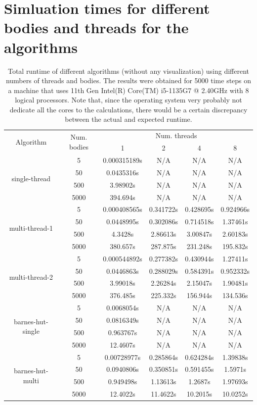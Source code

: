 \documentclass[12pt]{article}
\begin{document}
\appendix
\section{Simluation times for different bodies and threads for the algorithms}
\label{appendix:table}
\begin{table}[htb]
\centering
\begin{tabular}{ |c|c|c|c|c|c| } 
 \hline
 \multirow{2}{8em}{\centering Algorithm}
 & \multirow{2}{4em}{\centering Num. bodies} & \multicolumn{4}{c|}{\centering Num. threads} \\
 \cline{3-6}  
 & & 1 & 2 & 4 & 8\\ 
 \hline
 \multirow{4}{8em}{\centering single-thread} 
 & 5 & 0.000315189s & N/A & N/A & N/A \\ 
 & 50 & 0.0435316s & N/A & N/A & N/A \\ 
 & 500 & 3.98902s & N/A & N/A & N/A \\ 
 & 5000 & 394.694s & N/A & N/A & N/A \\ 
 \hline
 \multirow{4}{8em}{\centering multi-thread-1} 
 & 5 & 0.000408565s & 0.341722s & 0.428695s & 0.924966s \\ 
 & 50 & 0.0448995s & 0.302086s & 0.714518s & 1.37461s \\ 
 & 500 & 4.3428s & 2.86613s & 3.00847s & 2.60183s \\ 
 & 5000 & 380.657s & 287.875s & 231.248s & 195.832s \\ 
 \hline
 \multirow{4}{8em}{\centering multi-thread-2} 
 & 5 & 0.000544892s & 0.277382s & 0.430944s & 1.27411s \\ 
 & 50 & 0.0446863s & 0.288029s & 0.584391s & 0.952332s \\ 
 & 500 & 3.99018s & 2.26284s & 2.15047s & 1.90481s \\ 
 & 5000 & 376.485s & 225.332s & 156.944s & 134.536s \\ 
 \hline
 \multirow{4}{8em}{\centering barnes-hut-single} 
 & 5 & 0.0068054s & N/A & N/A & N/A\\ 
 & 50 & 0.0816349s & N/A & N/A & N/A \\ 
 & 500 & 0.963767s& N/A & N/A & N/A \\ 
 & 5000 & 12.4607s & N/A & N/A & N/A \\
 \hline
 \multirow{4}{8em}{\centering barnes-hut-multi} 
 & 5 & 0.00728977s & 0.285864s & 0.624284s & 1.39838s \\ 
 & 50 & 0.0940806s & 0.350851s & 0.591455s & 1.5971s \\ 
 & 500 & 0.949498s & 1.13613s & 1.2687s & 1.97693s \\ 
 & 5000 & 12.4022s & 11.4622s & 10.2015s & 10.0252s \\ 
  \hline
\end{tabular}
\caption{Total runtime of different algorithms (without any visualization) using different numbers of threads and bodies. 
The results were obtained for 5000 time steps on a machine that uses 11th Gen Intel(R) Core(TM) i5-1135G7 @ 2.40GHz with 8 logical processors.
Note that, since the operating system very probably not dedicate all the cores to the calculations, there would be a certain discrepancy between the actual and expected runtime.
}
\label{table:simulation-time}
\end{table}

\newpage
\printbibliography
\end{document}
